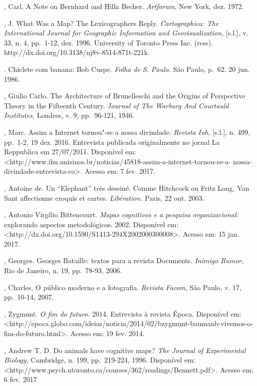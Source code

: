 \begin{Parskip}
, Carl. A Note on Bernhard and Hilla Becher. \emph{Artforum}, New
York, dez. 1972.

, J. What Was a Map? The Lexicographers Reply.
\emph{Cartographica: The International Journal for Geographic
Information and Geovisualization,} {[}s.l.{]}, v. 33, n. 4, pp.~1-12, dez.
1996. University of Toronto Press Inc. (ress).
http://dx.doi.org/10.3138/nj8v-8514-871t-221k.

. Chiclete com banana: Bob Cuspe. \emph{Folha de S. Paulo.} São
Paulo, p.~62. 20 jun. 1986.

, Giulio Carlo. The Architecture of Brunelleschi and the Origins of
Perspective Theory in the Fifteenth Century. \emph{Journal of The
Warburg And Courtauld Institutes,} Londres, v. 9, pp.~96-121, 1946.

, Marc. Assim a Internet tornou"-se a nossa divindade.
\emph{Revista Iuh,} {[}s.l.{]}, n. 499, pp.~1-2, 19 dez. 2016.
Entrevista publicada originalmente no jornal La Reppublica em
27/07/2011. Disponível em:
\textless{}http://www.ihu.unisinos.br/noticias/45818-assim-a-internet-tornou-se-a-
nossa-divindade-entrevista-co\textgreater{}. Acesso em: 7 fev. 2017.

, Antoine de. Un ``Elephant'' très dessiné: Comme Hitchcock ou
Fritz Lang, Van Sant affectionne croquis et
cartes. \emph{Libération.} Paris, 22 out. 2003.

, Antonio Virgílio Bittencourt. \emph{Mapas cognitivos e a
pesquisa organizacional:} explorando aspectos metodológicos. 2002.
Disponível em:
\textless{}http://dx.doi.org/10.1590/S1413-294X2002000300008\textgreater{}.
Acesso em: 15 jan. 2017.

, Georges. Georges Bataille: textos para a revista Documents.
\emph{Inimigo Rumor,} Rio de Janeiro, n. 19, pp.~78-93, 2006.

, Charles. O público moderno e a fotografia. \emph{Revista
Facom}, São Paulo, v. 17, pp.~10-14, 2007.

, Zygmunt. \emph{O fim do futuro.} 2014. Entrevista à revista
Época. Disponível em:
\textless{}http://epoca.globo.com/ideias/noticia/2014/02/bzygmunt-baumanb-vivemos-o-fim-do-futuro.html\textgreater{}.
Acesso em: 19 fev. 2014.

, Andrew T. D. Do animals have cognitive maps? \emph{The
Journal of Experimental Biology,} Cambridge, n. 199, pp.~219-224, 1996.
Disponível em:
\textless{}http://www.psych.utoronto.ca/courses/362/readings/Bennett.pdf\textgreater{}.
Acesso em: 6 fev. 2017


\end{Parskip}
